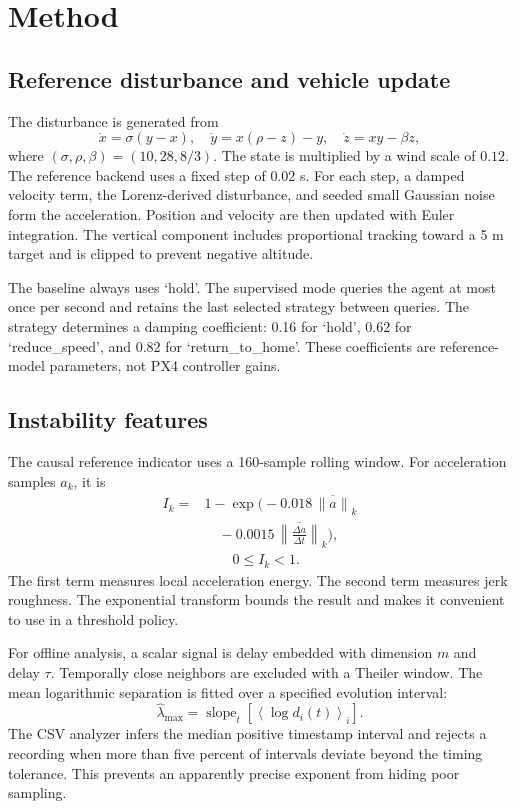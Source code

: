 \documentclass[11pt,a4paper,twocolumn]{article}
\begin{document}
\section{Method}
\subsection{Reference disturbance and vehicle update}
The disturbance is generated from
\begin{equation}
\dot{x}=\sigma(y-x),\quad \dot{y}=x(\rho-z)-y,\quad
\dot{z}=xy-\beta z,
\label{eq:lorenz}
\end{equation}
where $(\sigma,\rho,\beta)=(10,28,8/3)$. The state is multiplied by a wind
scale of $0.12$. The reference backend uses a fixed step of $0.02$ s. For each
step, a damped velocity term, the Lorenz-derived disturbance, and seeded small
Gaussian noise form the acceleration. Position and velocity are then updated
with Euler integration. The vertical component includes proportional tracking
toward a 5 m target and is clipped to prevent negative altitude.

The baseline always uses `hold'. The supervised mode queries the agent at most
once per second and retains the last selected strategy between queries. The
strategy determines a damping coefficient: 0.16 for `hold', 0.62 for
`reduce\_speed', and 0.82 for `return\_to\_home'. These coefficients are
reference-model parameters, not PX4 controller gains.

\subsection{Instability features}
The causal reference indicator uses a 160-sample rolling window. For
acceleration samples $a_k$, it is
\begin{equation}
 \begin{aligned}
 I_k={}&1-\exp\biggl(-0.018\,\overline{\lVert a\rVert}_k\\[-0.2ex]
 &\quad -0.0015\,\overline{\left\lVert\frac{\Delta a}{\Delta t}\right\rVert}_k\biggr),\\
 &\qquad 0\leq I_k<1.
 \end{aligned}
\label{eq:indicator}
\end{equation}
The first term measures local acceleration energy. The second term measures
jerk roughness. The exponential transform bounds the result and makes it
convenient to use in a threshold policy.

For offline analysis, a scalar signal is delay embedded with dimension $m$ and
delay $\tau$. Temporally close neighbors are excluded with a Theiler window.
The mean logarithmic separation is fitted over a specified evolution interval:
\begin{equation}
 \widehat{\lambda}_{\max}=\operatorname{slope}_t
 \left[\left\langle\log d_i(t)\right\rangle_i\right].
\label{eq:lyapunov}
\end{equation}
The CSV analyzer infers the median positive timestamp interval and rejects a
recording when more than five percent of intervals deviate beyond the timing
tolerance. This prevents an apparently precise exponent from hiding poor
sampling.
\end{document}

